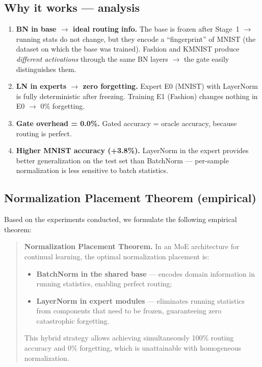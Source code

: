 \documentclass[11pt,a4paper]{report}
\begin{document}
\subsection{Why it works --- analysis}

\begin{enumerate}
    \item \textbf{BN in base $\to$ ideal routing info.} The base is frozen after Stage~1 $\to$ running stats do not change, but they encode a ``fingerprint'' of MNIST (the dataset on which the base was trained). Fashion and KMNIST produce \emph{different activations} through the same BN layers $\to$ the gate easily distinguishes them.

    \item \textbf{LN in experts $\to$ zero forgetting.} Expert E0 (MNIST) with LayerNorm is fully deterministic after freezing. Training E1 (Fashion) changes nothing in E0 $\to$ 0\% forgetting.

    \item \textbf{Gate overhead = 0.0\%.} Gated accuracy = oracle accuracy, because routing is perfect.

    \item \textbf{Higher MNIST accuracy (+3.8\%).} LayerNorm in the expert provides better generalization on the test set than BatchNorm --- per-sample normalization is less sensitive to batch statistics.
\end{enumerate}

\subsection{Normalization Placement Theorem (empirical)}

Based on the experiments conducted, we formulate the following empirical theorem:

\begin{quote}
\textbf{Normalization Placement Theorem.}
In an MoE architecture for continual learning, the optimal normalization placement is:
\begin{itemize}
    \item \textbf{BatchNorm in the shared base} --- encodes domain information in running statistics, enabling perfect routing;
    \item \textbf{LayerNorm in expert modules} --- eliminates running statistics from components that need to be frozen, guaranteeing zero catastrophic forgetting.
\end{itemize}
This hybrid strategy allows achieving simultaneously 100\% routing accuracy and 0\% forgetting, which is unattainable with homogeneous normalization.
\end{quote}
\end{document}
